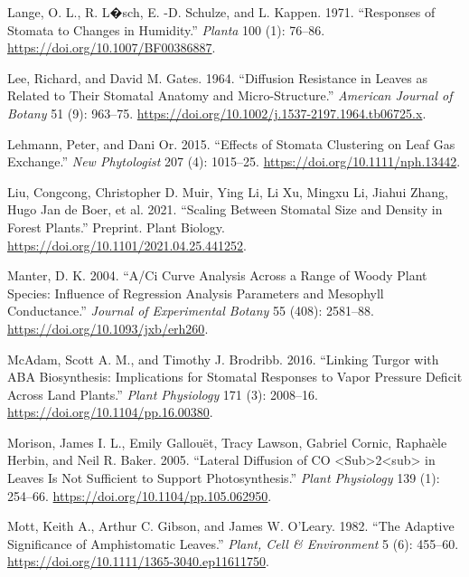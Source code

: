 \documentclass[12pt,halfline,a4paper,]{ouparticle}
\newlength{\cslhangindent}
\newlength{\cslentryspacingunit} %
\newenvironment{CSLReferences}[2] %
 {%
  \setlength{\parindent}{0pt}
  \ifodd #1
  \let\oldpar\par
  \def\par{\hangindent=\cslhangindent\oldpar}
  \fi
  \setlength{\parskip}{#2\cslentryspacingunit}
 }%
 {}
\begin{document}
\begin{CSLReferences}{1}{0}
\leavevmode{}%
Lange, O. L., R. L�sch, E. -D. Schulze, and L. Kappen. 1971.
{``Responses of Stomata to Changes in Humidity.''} \emph{Planta} 100
(1): 76--86. \url{https://doi.org/10.1007/BF00386887}.

\leavevmode{}%
Lee, Richard, and David M. Gates. 1964. {``Diffusion Resistance in
Leaves as Related to Their Stomatal Anatomy and Micro-Structure.''}
\emph{American Journal of Botany} 51 (9): 963--75.
\url{https://doi.org/10.1002/j.1537-2197.1964.tb06725.x}.

\leavevmode{}%
Lehmann, Peter, and Dani Or. 2015. {``Effects of Stomata Clustering on
Leaf Gas Exchange.''} \emph{New Phytologist} 207 (4): 1015--25.
\url{https://doi.org/10.1111/nph.13442}.

\leavevmode{}%
Liu, Congcong, Christopher D. Muir, Ying Li, Li Xu, Mingxu Li, Jiahui
Zhang, Hugo Jan de Boer, et al. 2021. {``Scaling Between Stomatal Size
and Density in Forest Plants.''} Preprint. Plant Biology.
\url{https://doi.org/10.1101/2021.04.25.441252}.

\leavevmode{}%
Manter, D. K. 2004. {``A/{Ci} Curve Analysis Across a Range of Woody
Plant Species: Influence of Regression Analysis Parameters and Mesophyll
Conductance.''} \emph{Journal of Experimental Botany} 55 (408):
2581--88. \url{https://doi.org/10.1093/jxb/erh260}.

\leavevmode{}%
McAdam, Scott A. M., and Timothy J. Brodribb. 2016. {``Linking {Turgor}
with {ABA} {Biosynthesis}: {Implications} for {Stomatal} {Responses} to
{Vapor} {Pressure} {Deficit} Across {Land} {Plants}.''} \emph{Plant
Physiology} 171 (3): 2008--16.
\url{https://doi.org/10.1104/pp.16.00380}.

\leavevmode{}%
Morison, James I. L., Emily Gallouët, Tracy Lawson, Gabriel Cornic,
Raphaèle Herbin, and Neil R. Baker. 2005. {``Lateral {Diffusion} of {CO}
{\textless{}}Sub{\textgreater{}}2{\textless{}}sub{\textgreater{}} in
{Leaves} {Is} {Not} {Sufficient} to {Support} {Photosynthesis}.''}
\emph{Plant Physiology} 139 (1): 254--66.
\url{https://doi.org/10.1104/pp.105.062950}.

\leavevmode{}%
Mott, Keith A., Arthur C. Gibson, and James W. O'Leary. 1982. {``The
Adaptive Significance of Amphistomatic Leaves.''} \emph{Plant, Cell \&
Environment} 5 (6): 455--60.
\url{https://doi.org/10.1111/1365-3040.ep11611750}.


\end{CSLReferences}
\end{document}
